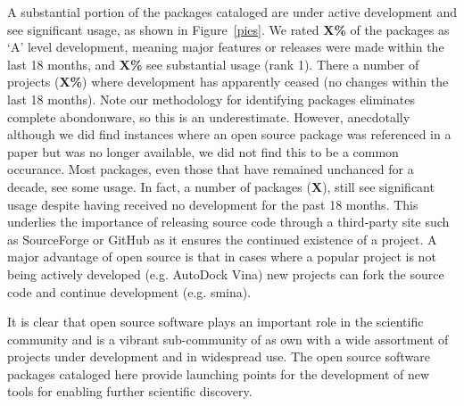 A substantial portion of the packages cataloged are under active development and see significant usage, as shown in Figure~\ref{pies}.  We rated \textbf{X\%} of the packages as `A' level development, meaning major features or releases were made within the last 18 months, and \textbf{X\%} see substantial usage (rank 1).  
There a number of projects (\textbf{X\%}) where development has apparently ceased (no changes within the last 18 months). Note our methodology for identifying packages eliminates complete abondonware, so this is an underestimate.  However, anecdotally although we did find instances where an open source package was referenced in a paper but was no longer available, we did not find this to be a common occurance.  Most packages, even those that have remained unchanced for a decade, see some usage.  In fact, a number of packages (\textbf{X}), still see significant usage despite having received no development for the past 18 months.  This underlies the importance of releasing source code through a third-party site such as SourceForge or GitHub as it ensures the continued existence of a project.  A major advantage of open source is that in cases where a popular project is not being actively developed (e.g. AutoDock Vina) new projects can fork the source code and continue development (e.g. smina).

It is clear that open source software plays an important role in the scientific community and is a vibrant sub-community of as own with a wide assortment of projects under development and in widespread use.  The open source software packages cataloged here provide launching points for the development of new tools for enabling further scientific discovery.
